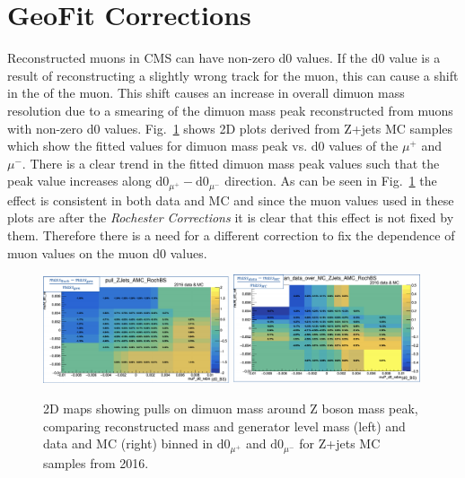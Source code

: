 \section{GeoFit Corrections}
\label{sec:app_geofitcorr}
Reconstructed muons in CMS can have non-zero d0 values. If the d0 value is a result of reconstructing a slightly wrong track for the muon, this can cause a shift in the \pt of the muon. This \pt shift causes an increase in overall dimuon mass resolution due to a smearing of the dimuon mass peak reconstructed from muons with non-zero d0 values. Fig.~\ref{fig:2D_Z_mass_vs_d0} shows 2D plots derived from Z+jets MC samples which show the fitted values for dimuon mass peak vs. d0 values of the $\mu^+$ and $\mu^-$. There is a clear trend in the fitted dimuon mass peak values such that the peak value increases along $\text{d0}_{\mu^+}-\text{d0}_{\mu^-}$ direction. As can be seen in Fig.~\ref{fig:2D_Z_mass_vs_d0} the effect is consistent in both data and MC and since the muon \pt values used in these plots are after the \textit{Rochester Corrections} it is clear that this effect is not fixed by them. Therefore there is a need for a different correction to fix the dependence of muon \pt values on the muon d0 values. 

\begin{figure}[h!]
    \centering
    \includegraphics[width=0.49\textwidth]{images_geofit/2D_Z_mass_vs_d0_pulls.png}
    \includegraphics[width=0.49\textwidth]{images_geofit/2D_Z_mass_vs_d0_data_MC.png}
    \caption{2D maps showing pulls on dimuon mass around Z boson mass peak, comparing reconstructed mass and generator level mass (left) and data and MC (right) binned in $\text{d0}_{\mu^+}$ and $\text{d0}_{\mu^-}$ for Z+jets MC samples from 2016.}
    \label{fig:2D_Z_mass_vs_d0}
\end{figure}

